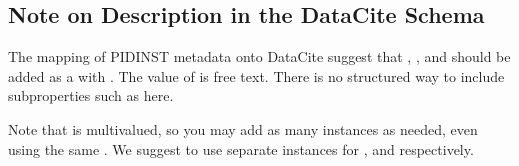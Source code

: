 \documentclass[a4paper,10pt,english]{sphinxmanual}
\begin{document}
\subsection{Note on Description in the DataCite Schema}
\label{\detokenize{datacite-cookbook/metadata:note-on-description-in-the-datacite-schema}}
\sphinxAtStartPar
The mapping of PIDINST metadata onto DataCite suggest that ,
, and  should be added as a
 with .  The value of
 is free text.  There is no structured way to include
subproperties such as  here.

\sphinxAtStartPar
Note that  is multivalued, so you may add as many
instances as needed, even using the same .  We
suggest to use separate  instances for ,
 and  respectively.
\end{document}
